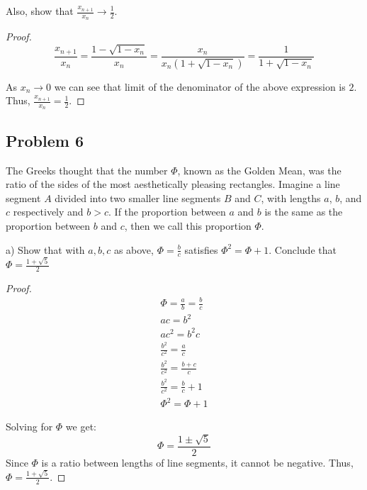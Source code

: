 \documentclass{article}
\begin{document}
\begin{tcolorbox}
Also, show that $\frac{x_{n+1}}{x_n} \to \frac{1}{2}$.
\end{tcolorbox}

\begin{proof}

\[ \frac{x_{n+1}}{x_n} = \frac{1-\sqrt{1-x_n}}{x_n} = \frac{x_n}{x_n \left( 1+\sqrt{1-x_n} \right) } = \frac{1}{1+\sqrt{1-x_n}} \]

As $x_n \to 0$ we can see that limit of the denominator of the above expression is $2$. Thus, $\frac{x_{n+1}}{x_n} = \frac{1}{2}$.

\end{proof}


\subsection*{Problem 6}

\begin{tcolorbox}
The Greeks thought that the number $\Phi$, known as the Golden Mean, was the ratio of the sides of the most aesthetically pleasing rectangles.
Imagine a line segment $A$ divided into two smaller line segments $B$ and $C$, with lengths $a$, $b$, and $c$ respectively and $b > c$.
If the proportion between $a$ and $b$ is the same as the proportion between $b$ and $c$, then we call this proportion $\Phi$.

a) Show that with $a, b, c$ as above, $\Phi = \frac{b}{c}$ satisfies $\Phi^2 = \Phi + 1$.
Conclude that $\Phi = \frac{1+\sqrt{5}}{2}$
\end{tcolorbox}

\begin{proof}

\begin{gather*}
    \Phi = \frac{a}{b} = \frac{b}{c} \\
    ac=b^2 \\
    ac^2 = b^2 c \\
    \frac{b^2}{c^2} = \frac{a}{c} \\
    \frac{b^2}{c^2} = \frac{b+c}{c} \\
    \frac{b^2}{c^2} = \frac{b}{c} + 1 \\
    \Phi^2 = \Phi + 1
\end{gather*}

Solving for $\Phi$ we get:
\[ \Phi = \frac{1 \pm \sqrt{5}}{2} \]
Since $\Phi$ is a ratio between lengths of line segments, it cannot be negative.
Thus, $\Phi = \frac{1 + \sqrt{5}}{2}$.

\end{proof}
\end{document}
